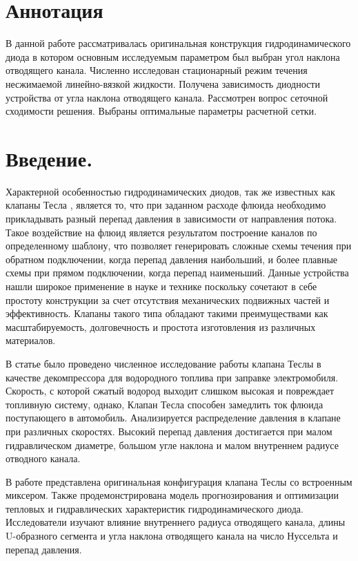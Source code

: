 \documentclass[14pt,a4paper]{article}
\begin{document}
    
    \section*{Аннотация}

        В данной работе рассматривалась оригинальная конструкция гидродинамического диода в котором основным исследуемым параметром был выбран угол наклона отводящего канала. Численно исследован стационарный режим течения несжимаемой линейно-вязкой жидкости. Получена зависимость диодности устройства от угла наклона отводящего канала. Рассмотрен вопрос сеточной сходимости решения. Выбраны оптимальные параметры расчетной сетки.

    \section*{Введение.}

        Характерной особенностью гидродинамических диодов, так же известных как клапаны Тесла \cite{TeslaValveReview}, является то, что при заданном расходе флюида необходимо прикладывать разный перепад давления в зависимости от направления потока. Такое воздействие на флюид является результатом построение каналов по определенному шаблону, что позволяет генерировать сложные схемы течения при обратном подключении, когда перепад давления наибольший, и более плавные схемы при прямом подключении, когда перепад наименьший. Данные устройства нашли широкое применение в науке и технике поскольку сочетают в себе простоту конструкции за счет отсутствия механических подвижных частей и эффективность. Клапаны такого типа обладают такими преимуществами как масштабируемость, долговечность и простота изготовления из различных материалов.

        В статье \cite{JIN20188888} было проведено численное исследование работы клапана Теслы в качестве декомпрессора для водородного топлива при заправке электромобиля. Скорость, с которой сжатый водород выходит слишком высокая и повреждает топливную систему, однако, Клапан Тесла способен замедлить ток флюида поступающего в автомобиль. Анализируется распределение давления в клапане при различных скоростях. Высокий перепад давления достигается при малом гидравлическом диаметре, большом угле наклона и малом внутреннем радиусе отводного канала. 
        
        В работе \cite{DU2023103670} представлена оригинальная конфигурация клапана Теслы со встроенным миксером. Также продемонстрирована модель прогнозирования и оптимизации тепловых и гидравлических характеристик гидродинамического диода. Исследователи изучают влияние внутреннего радиуса отводящего канала, длины U-образного сегмента и угла наклона отводящего канала на число Нуссельта и перепад давления.
        
\end{document}
